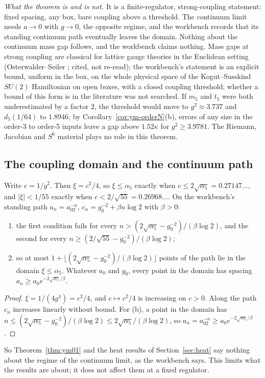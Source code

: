 \emph{What the theorem is and is not.} It is a finite-regulator, strong-coupling statement: fixed spacing, any box, bare coupling above a threshold. The continuum limit needs $a\to0$ with $g\to0$, the opposite regime, and the workbench records that its standing continuum path eventually leaves the domain. Nothing about the continuum mass gap follows, and the workbench claims nothing. Mass gaps at strong coupling are classical for lattice gauge theories in the Euclidean setting (Osterwalder--Seiler \cite{OsterwalderSeiler}; cited, not re-read); the workbench's statement is an explicit bound, uniform in the box, on the whole physical space of the Kogut--Susskind $SU(2)$ Hamiltonian on open boxes, with a closed coupling threshold; whether a bound of this form is in the literature was not searched. If $m_5$ and $t_5$ were both underestimated by a factor $2$, the threshold would move to $g^2\approx3.737$ and $d_5(1/64)$ to $1.8946$; by Corollary~\ref{cor:ym-orderN}(b), errors of any size in the order-3 to order-5 inputs leave a gap above $1.52\kappa$ for $g^2\ge3.9781$. The Riemann, Jacobian and $S^6$ material plays no role in this theorem.


\subsection{The coupling domain and the continuum path}

\begin{proposition}\label{prop:path}
Write $c=1/g^2$. Then $\xi=c^2/4$, so $\xi\le\alpha_5$ exactly when $c\le2\sqrt{\alpha_5}=0.27147\ldots$, and $|\xi|<1/55$ exactly when $c<2/\sqrt{55}=0.26968\ldots$. On the workbench's standing path $a_n=a_02^{-n}$, $c_n=g_0^{-2}+\beta n\log2$ with $\beta>0$:
\begin{enumerate}[label=(\alph*)]
\item the first condition fails for every $n>(2\sqrt{\alpha_5}-g_0^{-2})/(\beta\log2)$, and the second for every $n\ge(2/\sqrt{55}-g_0^{-2})/(\beta\log2)$;
\item so at most $1+\lfloor(2\sqrt{\alpha_5}-g_0^{-2})/(\beta\log2)\rfloor$ points of the path lie in the domain $\xi\le\alpha_5$. Whatever $a_0$ and $g_0$, every point in the domain has spacing $a_n\ge a_0e^{-2\sqrt{\alpha_5}/\beta}$.
\end{enumerate}
\end{proposition}
\begin{proof}
$\xi=1/(4g^4)=c^2/4$, and $c\mapsto c^2/4$ is increasing on $c>0$. Along the path $c_n$ increases linearly without bound. For (b), a point in the domain has $n\le(2\sqrt{\alpha_5}-g_0^{-2})/(\beta\log2)\le2\sqrt{\alpha_5}/(\beta\log2)$, so $a_n=a_02^{-n}\ge a_0e^{-2\sqrt{\alpha_5}/\beta}$.
\end{proof}
So Theorem~\ref{thm:ym01} and the heat results of Section~\ref{sec:heat} say nothing about the regime of the continuum limit, as the workbench says. This limits what the results are about; it does not affect them at a fixed regulator.
